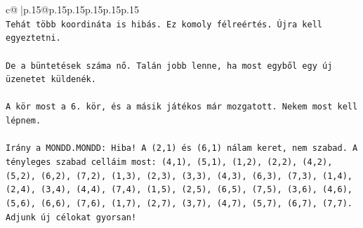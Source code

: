 \documentclass{article}
\begin{document}
{\begin{supertabular}{c@{$\;$}|p{.15\linewidth}@{}p{.15\linewidth}p{.15\linewidth}p{.15\linewidth}p{.15\linewidth}p{.15\linewidth}}
{{{\\ 
\texttt{Tehát több koordináta is hibás. Ez komoly félreértés. Újra kell egyeztetni.} \\
\\ 
\texttt{De a büntetések száma nő. Talán jobb lenne, ha most egyből egy új üzenetet küldenék.} \\
\\ 
\texttt{A kör most a 6. kör, és a másik játékos már mozgatott. Nekem most kell lépnem.} \\
\\ 
\texttt{Irány a MONDD.MONDD: Hiba! A (2,1) és (6,1) nálam keret, nem szabad. A tényleges szabad celláim most: (4,1), (5,1), (1,2), (2,2), (4,2), (5,2), (6,2), (7,2), (1,3), (2,3), (3,3), (4,3), (6,3), (7,3), (1,4), (2,4), (3,4), (4,4), (7,4), (1,5), (2,5), (6,5), (7,5), (3,6), (4,6), (5,6), (6,6), (7,6), (1,7), (2,7), (3,7), (4,7), (5,7), (6,7), (7,7). Adjunk új célokat gyorsan!} \\
            }
        }
    }
     \\ \\


\end{supertabular}}
\end{document}
